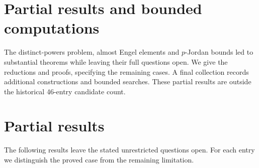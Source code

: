 \iffullpaper
\section{Partial results and bounded computations}
\label{app:partials}

The distinct-powers problem, almost Engel elements and \(p\)-Jordan
bounds led to substantial theorems while leaving their full questions
open. We give the reductions and proofs, specifying the remaining cases.
A final collection records additional constructions and bounded searches.
These partial results are outside the historical 46-entry candidate count.

\else
\section{Partial results}\label{app:partials}
The following results leave the stated unrestricted questions open.
For each entry we distinguish the proved case from the remaining limitation.
\fi




